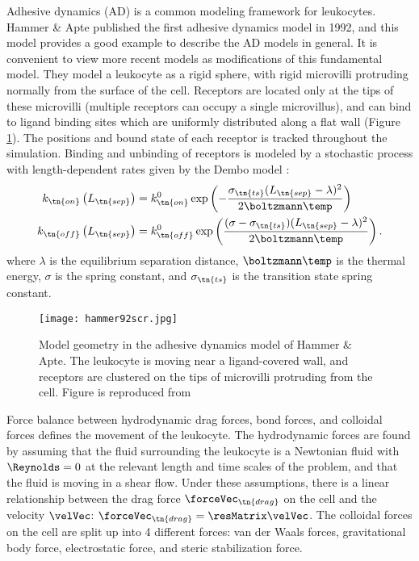 Adhesive dynamics (AD) is a common modeling framework for
leukocytes. Hammer \& Apte \cite{Hammer1992} published the first
adhesive dynamics model in 1992, and this model provides a good
example to describe the AD models in general. It is convenient to view
more recent models as modifications of this fundamental model. They
model a leukocyte as a rigid sphere, with rigid microvilli protruding
normally from the surface of the cell. Receptors are located only at
the tips of these microvilli (multiple receptors can occupy a single
microvillus), and can bind to ligand binding sites which are uniformly
distributed along a flat wall (Figure \ref{fig:ad-geom}). The
positions and bound state of each receptor is tracked throughout the
simulation. Binding and unbinding of receptors is modeled by a
stochastic process with length-dependent rates given by the Dembo
model \cite{Dembo1988}:
\begin{align}
  \label{eq:dembo-on}
  k_\tn{on} \left(L_\tn{sep}\right)
  &= k_\tn{on}^0 \exp \left( -\frac{\sigma_\tn{ts} (L_\tn{sep} -
    \lambda)^2}{2\boltzmann \temp} \right) \\
  \label{eq:dembo-off}
  k_\tn{off} \left(L_\tn{sep}\right)
  &= k_\tn{off}^0 \exp \left( \frac{(\sigma - \sigma_\tn{ts})
    (L_\tn{sep} - \lambda)^2}{2 \boltzmann \temp} \right).
\end{align}
where $\lambda$ is the equilibrium separation distance,
$\boltzmann\temp$ is the thermal energy, $\sigma$ is the spring
constant, and $\sigma_\tn{ts}$ is the transition state spring
constant.

\begin{figure}
  \centering
  \texttt{[image: hammer92scr.jpg]}
  \caption[Model geometry in the adhesive dynamics model of Hammer \&
  Apte.]{Model geometry in the adhesive dynamics model of Hammer \&
    Apte. The leukocyte is moving near a ligand-covered wall, and
    receptors are clustered on the tips of microvilli protruding from
    the cell. Figure is reproduced from \cite{Hammer1992}}
  \label{fig:ad-geom}
\end{figure}

Force balance between hydrodynamic drag forces, bond forces, and
colloidal forces defines the movement of the leukocyte. The
hydrodynamic forces are found by assuming that the fluid surrounding
the leukocyte is a Newtonian fluid with $\Reynolds = 0$ at the
relevant length and time scales of the problem, and that the fluid is
moving in a shear flow. Under these assumptions, there is a linear
relationship between the drag force $\forceVec_\tn{drag}$ on the cell and the
velocity $\velVec$: $\forceVec_\tn{drag} = \resMatrix \velVec$. The colloidal
forces on the cell are split up into 4 different forces: van der Waals
forces, gravitational body force, electrostatic force, and steric
stabilization force.


